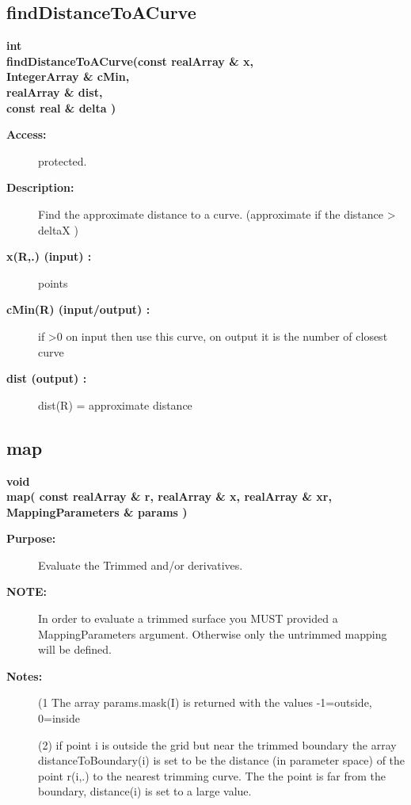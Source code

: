 \subsection{findDistanceToACurve}
 
\begin{flushleft} \textbf{%
int  \\ 
\settowidth{\TrimmedMappingIncludeArgIndent}{findDistanceToACurve(}%
findDistanceToACurve(const realArray \& x, \\ 
\hspace{\TrimmedMappingIncludeArgIndent}IntegerArray  \& cMin, \\ 
\hspace{\TrimmedMappingIncludeArgIndent}realArray \& dist,\\ 
\hspace{\TrimmedMappingIncludeArgIndent}const real \& delta )
}\end{flushleft}
\begin{description}
\item[{\bf Access:}]  protected.
\item[{\bf Description:}] 
   Find the approximate distance to a curve. (approximate if the distance > deltaX )

\item[{\bf x(R,.) (input) :}]  points
\item[{\bf cMin(R) (input/output) :}]  if >0 on input then use this curve, on output it is the number of closest curve
\item[{\bf dist (output) :}]  dist(R) = approximate distance
 
\end{description}
\subsection{map}
 
\begin{flushleft} \textbf{%
void  \\ 
\settowidth{\TrimmedMappingIncludeArgIndent}{map(}%
map( const realArray \& r, realArray \& x, realArray \& xr, MappingParameters \& params )
}\end{flushleft}
\begin{description}
\item[{\bf Purpose:}]  Evaluate the Trimmed and/or derivatives. 
\item[{\bf NOTE:}]  In order to evaluate a trimmed surface you MUST provided a MappingParameters argument.
        Otherwise only the untrimmed mapping will be defined.
  
\item[{\bf Notes:}] 
  (1 The array params.mask(I) is returned with the values -1=outside, 0=inside
   
  (2) if point i is outside the grid but near the trimmed boundary 
  the array distanceToBoundary(i) is set to 
  be the distance (in parameter space) of the point r(i,.) to the nearest
  trimming curve. The the point is far from the boundary, distance(i) is set to a large value.

\end{description}
